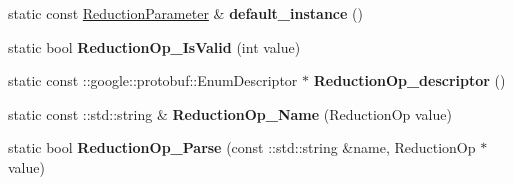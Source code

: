 \begin{DoxyCompactItemize}
static const \mbox{\hyperlink{classcaffe_1_1_reduction_parameter}{Reduction\+Parameter}} \& {\bfseries default\+\_\+instance} ()
\item 
\mbox{\label{classcaffe_1_1_reduction_parameter_a9676849fdfc7c6088b10c4de7f19e901}} 
static bool {\bfseries Reduction\+Op\+\_\+\+Is\+Valid} (int value)
\item 
\mbox{\label{classcaffe_1_1_reduction_parameter_a096eb64c4791168ddf50d3ff603d9f16}} 
static const \+::google\+::protobuf\+::\+Enum\+Descriptor $\ast$ {\bfseries Reduction\+Op\+\_\+descriptor} ()
\item 
\mbox{\label{classcaffe_1_1_reduction_parameter_aa283a046933d6f0c2f7ac29c93903e95}} 
static const \+::std\+::string \& {\bfseries Reduction\+Op\+\_\+\+Name} (Reduction\+Op value)
\item 
\mbox{\label{classcaffe_1_1_reduction_parameter_ab653ee0ececb681924d236417c3bc809}} 
static bool {\bfseries Reduction\+Op\+\_\+\+Parse} (const \+::std\+::string \&name, Reduction\+Op $\ast$value)
\end{DoxyCompactItemize}
